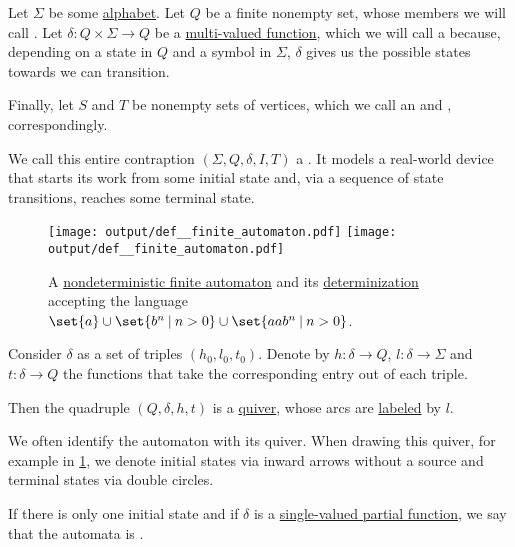 \begin{definition}\label{def:finite_automaton}
  Let \( \Sigma \) be some \hyperref[def:formal_language]{alphabet}. Let \( Q \) be a finite nonempty set, whose members we will call . Let \( \delta: Q \times \Sigma \to Q \) be a \hyperref[def:multi_valued_function/total]{multi-valued function}, which we will call a  because, depending on a state in \( Q \) and a symbol in \( \Sigma \), \( \delta \) gives us the possible states towards we can transition.

  Finally, let \( S \) and \( T \) be nonempty sets of vertices, which we call an  and , correspondingly.

  We call this entire contraption \( (\Sigma, Q, \delta, I, T) \) a . It models a real-world device that starts its work from some initial state and, via a sequence of state transitions, reaches some terminal state.

  \begin{figure}[!ht]
    \hfill
    \texttt{[image: output/def\_\_finite\_automaton.pdf]}
    \hfill
    \texttt{[image: output/def\_\_finite\_automaton.pdf]}
    \hfill\hfill
    \caption{A \hyperref[def:finite_automaton/determinism]{nondeterministic finite automaton} and its \hyperref[alg:determinization_of_finite_automata]{determinization} accepting the language \( \set{ a } \cup \set{ b^n \given n > 0 } \cup \set{ aa b^n \given n > 0 } \).}
    \label{fig:def:finite_automaton}
  \end{figure}

  \begin{thmenum}
     Consider \( \delta \) as a set of triples \( (h_0, l_0, t_0) \). Denote by \( h: \delta \to Q \), \( l: \delta \to \Sigma \) and \( t: \delta \to Q \) the functions that take the corresponding entry out of each triple.

    Then the quadruple \( (Q, \delta, h, t) \) is a \hyperref[def:quiver]{quiver}, whose arcs are \hyperref[def:weighted_set]{labeled} by \( l \).

    We often identify the automaton with its quiver. When drawing this quiver, for example in \cref{fig:def:finite_automaton}, we denote initial states via inward arrows without a source and terminal states via double circles.

     If there is only one initial state and if \( \delta \) is a \hyperref[def:partial_function]{single-valued partial function}, we say that the automata is .


\end{thmenum}
\end{definition}

